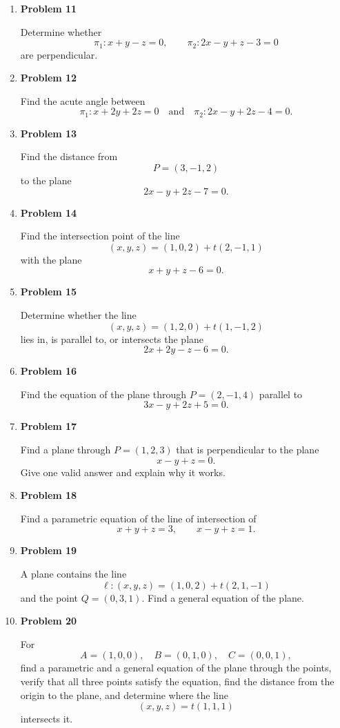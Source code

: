\begin{enumerate}
\item \textbf{Problem 11}\par
Determine whether
\[
\pi_1:x+y-z=0,
\qquad
\pi_2:2x-y+z-3=0
\]
are perpendicular.

\item \textbf{Problem 12}\par
Find the acute angle between
\[
\pi_1:x+2y+2z=0
\quad\text{and}\quad
\pi_2:2x-y+2z-4=0.
\]

\item \textbf{Problem 13}\par
Find the distance from
\[
P=(3,-1,2)
\]
to the plane
\[
2x-y+2z-7=0.
\]

\item \textbf{Problem 14}\par
Find the intersection point of the line
\[
(x,y,z)=(1,0,2)+t(2,-1,1)
\]
with the plane
\[
x+y+z-6=0.
\]

\item \textbf{Problem 15}\par
Determine whether the line
\[
(x,y,z)=(1,2,0)+t(1,-1,2)
\]
lies in, is parallel to, or intersects the plane
\[
2x+2y-z-6=0.
\]

\item \textbf{Problem 16}\par
Find the equation of the plane through \(P=(2,-1,4)\) parallel to
\[
3x-y+2z+5=0.
\]

\item \textbf{Problem 17}\par
Find a plane through \(P=(1,2,3)\) that is perpendicular to the plane
\[
x-y+z=0.
\]
Give one valid answer and explain why it works.

\item \textbf{Problem 18}\par
Find a parametric equation of the line of intersection of
\[
x+y+z=3,
\qquad
x-y+z=1.
\]

\item \textbf{Problem 19}\par
A plane contains the line
\[
\ell:(x,y,z)=(1,0,2)+t(2,1,-1)
\]
and the point \(Q=(0,3,1)\). Find a general equation of the plane.

\item \textbf{Problem 20}\par
For
\[
A=(1,0,0),\quad B=(0,1,0),\quad C=(0,0,1),
\]
find a parametric and a general equation of the plane through the points, verify that all three points satisfy the equation, find the distance from the origin to the plane, and determine where the line
\[
(x,y,z)=t(1,1,1)
\]
intersects it.
\end{enumerate}
